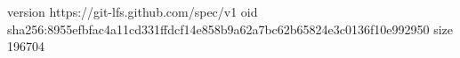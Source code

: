 version https://git-lfs.github.com/spec/v1
oid sha256:8955efbfac4a11cd331ffdcf14e858b9a62a7bc62b65824e3c0136f10e992950
size 196704
